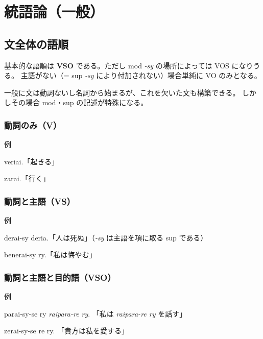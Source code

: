 \chapter{統語論（一般）}

\section{文全体の語順}

基本的な語順は \textbf{VSO} である。ただし mod \emph{-sy} の場所によっては VOS になりうる。
主語がない（= sup \emph{-sy} により付加されない）場合単純に VO のみとなる。

一般に文は動詞ないし名詞から始まるが、これを欠いた文も構築できる。
しかしその場合 mod・sup の記述が特殊になる。

\subsection{動詞のみ（V）}

\begin{itembox}[l]{例}
    \begin{pindent}
        \noindent
        veriai.「起きる」

        \noindent
        zarai.「行く」
    \end{pindent}
\end{itembox}

\subsection{動詞と主語（VS）}

\begin{itembox}[l]{例}
    \begin{pindent}
        \noindent
        derai-sy deria.「人は死ぬ」（\emph{-sy} は主語を項に取る sup である）

        \noindent
        benerai-sy ry.「私は悔やむ」
    \end{pindent}
\end{itembox}

\subsection{動詞と主語と目的語（VSO）}

\begin{itembox}[l]{例}
    \begin{pindent}
        \noindent
        parai-sy-se ry \emph{raipara-re ry}. 「私は \emph{raipara-re ry} を話す」

        \noindent
        zerai-sy-se re ry. 「貴方は私を愛する」
    \end{pindent}
\end{itembox}

